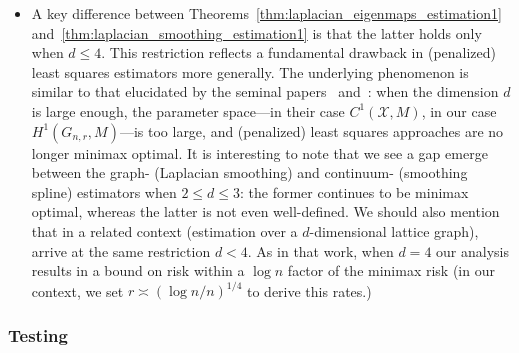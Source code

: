 \documentclass{article}
\newcommand{\1}{\mathbf{1}}
\newcommand{\Xset}{\mathcal{X}}
\theoremstyle{alden}
\theoremstyle{aldenthm}
\theoremstyle{definition}
\theoremstyle{remark}
\begin{document}
\begin{itemize}
	\item A key difference between Theorems~\ref{thm:laplacian_eigenmaps_estimation1} and~\ref{thm:laplacian_smoothing_estimation1} is that the latter holds only when $d \leq 4$. This restriction reflects a fundamental drawback in (penalized) least squares estimators more generally. The underlying phenomenon is similar to that elucidated by the seminal papers~\cite{birge1993} and~\cite{birge1998}: when the dimension $d$ is large enough, the parameter space---in their case $C^1(\Xset,M)$, in our case $H^1(G_{n,r},M)$---is too large, and (penalized) least squares approaches are no longer minimax optimal. It is interesting to note that we see a gap emerge between the graph- (Laplacian smoothing) and continuum- (smoothing spline) estimators when $2 \leq d \leq 3$: the former continues to be minimax optimal, whereas the latter is not even well-defined. We should also mention that in a related context (estimation over a $d$-dimensional lattice graph), \cite{sadhanala2016} arrive at the same restriction $d < 4$. As in that work, when $d = 4$ our analysis results in a bound on risk within a $\log n$ factor of the minimax risk (in our context, we set $r \asymp (\log n/n)^{1/4}$ to derive this rates.)
\end{itemize}

\subsubsection{Testing}
\end{document}
